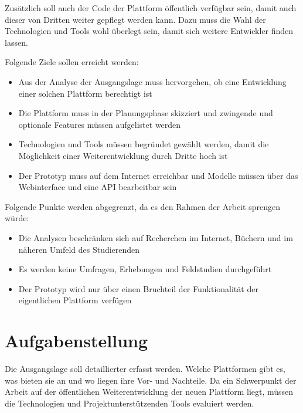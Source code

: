 \documentclass[]{scrreprt}
\begin{document}
    Zusätzlich soll auch der Code der Plattform öffentlich verfügbar sein, 
    damit auch dieser von Dritten weiter gepflegt werden kann. Dazu muss die 
    Wahl der Technologien und Tools wohl überlegt sein, damit sich weitere 
    Entwickler finden lassen.
    
    Folgende Ziele sollen erreicht werden:
    
    \begin{itemize}
        \item Aus der Analyse der Ausgangslage muss hervorgehen, ob eine
            Entwicklung einer solchen Plattform berechtigt ist
        \item Die Plattform muss in der Planungsphase skizziert und
            zwingende und optionale Features müssen aufgelistet werden
        \item Technologien und Tools müssen begründet gewählt werden, damit 
            die Möglichkeit einer Weiterentwicklung durch Dritte hoch ist
        \item Der Prototyp muss auf dem Internet erreichbar und Modelle
            müssen über das Webinterface und eine API bearbeitbar sein
    \end{itemize}
    
    Folgende Punkte werden abgegrenzt, da es den Rahmen der Arbeit sprengen 
    würde:
    
    \begin{itemize}
        \item Die Analysen beschränken sich auf Recherchen im Internet, 
            Büchern und im näheren Umfeld des Studierenden
        \item Es werden keine Umfragen, Erhebungen und Feldstudien 
            durchgeführt
        \item Der Prototyp wird nur über einen Bruchteil der Funktionalität 
            der eigentlichen Plattform verfügen
    \end{itemize}

    \section{Aufgabenstellung}
    Die Ausgangslage soll detaillierter erfasst werden. Welche Plattformen
    gibt es, was bieten sie an und wo liegen ihre Vor- und Nachteile.
    Da ein Schwerpunkt der Arbeit auf der öffentlichen Weiterentwicklung der
    neuen Plattform liegt, müssen die Technologien und Projektunterstützenden 
    Tools evaluiert werden.
    
\end{document}
